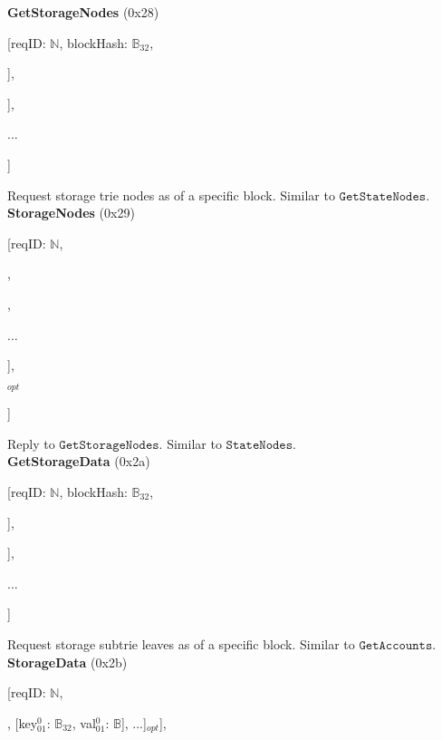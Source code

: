 \documentclass{amsart}
\begin{document}
\textbf{GetStorageNodes} (0x28)

[reqID: $\mathbb{N}$, blockHash: $\mathbb{B}_{32}$,

\quad [addressHash$^0$: $\mathbb{B}_{32}$, [prefix$^0_0$: $\mathbb{Y}$, prefix$^0_1$: $\mathbb{Y}$, ...]],

\quad [addressHash$^1$: $\mathbb{B}_{32}$, [prefix$^1_0$: $\mathbb{Y}$, prefix$^1_1$: $\mathbb{Y}$, ...]],

\quad ...

]
\medskip

Request storage trie nodes as of a specific block.
Similar to $\texttt{GetStateNodes}$.\\

\textbf{StorageNodes} (0x29)

[reqID: $\mathbb{N}$,

\quad [

\qquad [node$^0_0$: $\mathbb{B}$, node$^0_1$: $\mathbb{B}$, ...],

,

\qquad ...

\quad ],

$_{opt}$

]
\medskip

Reply to $\texttt{GetStorageNodes}$.
Similar to $\texttt{StateNodes}$.\\

\textbf{GetStorageData} (0x2a)

[reqID: $\mathbb{N}$, blockHash: $\mathbb{B}_{32}$,

\quad [addressHash$^0$: $\mathbb{B}_{32}$, [prefix$^0_0$: $\mathbb{Y}$, prefix$^0_1$: $\mathbb{Y}$, ...]],

\quad [addressHash$^1$: $\mathbb{B}_{32}$, [prefix$^1_0$: $\mathbb{Y}$, prefix$^1_1$: $\mathbb{Y}$, ...]],

\quad ...

]
\medskip

Request storage subtrie leaves as of a specific block.
Similar to $\texttt{GetAccounts}$.\\

\textbf{StorageData} (0x2b)
\nopagebreak

[reqID: $\mathbb{N}$,

\quad [

\qquad [

\quad \qquad [status$^0_0$: $\mathbb{N}$, [[key$^0_{00}$: $\mathbb{B}_{32}$, val$^0_{00}$: $\mathbb{B}$], [key$^0_{01}$: $\mathbb{B}_{32}$, val$^0_{01}$: $\mathbb{B}$], ...]$_{opt}$],
\end{document}

